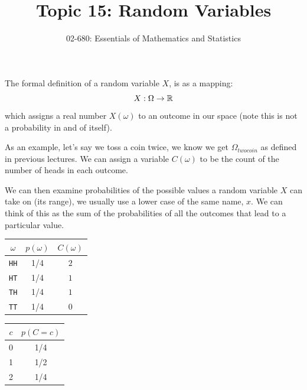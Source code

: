 

\title{Topic 15: Random Variables}
\author{02-680: Essentials of Mathematics and Statistics}


\maketitle

The formal definition of a random variable $X$, is as a mapping: \[X: \Omega \to \operatorname{\mathbb{R}}\]
which assigns a real number $X(\omega)$ to an outcome in our space (note this is not a probability in and of itself). 

As an example, let's say we toss a coin twice, we know we get $\Omega_{twocoin}$ as defined in previous lectures. 
We can assign a variable $C(\omega)$ to be the count of the number of heads in each outcome.


We can then examine probabilities of the possible values a random variable $X$ can take on (its range), 
we usually use a lower case of the same name, $x$. 
We can think of this as the sum of the probabilities 
of all the outcomes that lead to a particular value. 

\begin{center}
\begin{tabular}{c|c|c}
\textbf{$\omega$} & \textbf{$p(\omega)$} & \textbf{$C(\omega)$}\\
\hline
\texttt{HH}		& 1/4 &		$2$\\
\texttt{HT}		& 1/4 &		$1$\\
\texttt{TH}		& 1/4 &		$1$\\
\texttt{TT}		& 1/4 &		$0$\\
\end{tabular}%
%
\hspace{5em}%
%
\begin{tabular}{c|c}
\textbf{$c$} &	\textbf{$p(C=c)$}\\
\hline
0 &		1/4\\
1 &		1/2\\
2 & 		1/4\\
\end{tabular}
\end{center}

